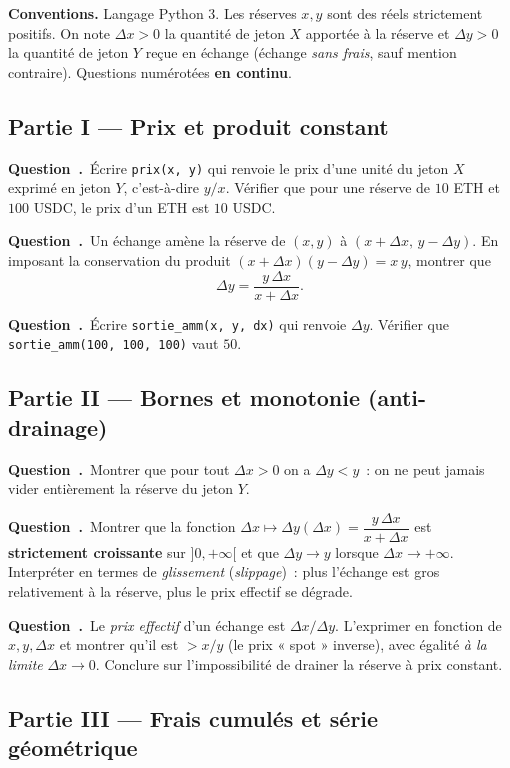 \documentclass[11pt,a4paper]{article}
\newcounter{qcnt}
\newcommand{\Q}{\medskip\par\stepcounter{qcnt}\noindent\textbf{Question~\theqcnt.}~}
\newcommand{\code}[1]{\lstinline!#1!}
\begin{document}
\noindent\textbf{Conventions.} Langage Python 3. Les réserves $x,y$ sont des réels
strictement positifs. On note $\Delta x > 0$ la quantité de jeton $X$ apportée à la réserve et
$\Delta y > 0$ la quantité de jeton $Y$ reçue en échange (échange \emph{sans frais}, sauf mention
contraire). Questions numérotées \textbf{en continu}.

\medskip
\subsection*{Partie I --- Prix et produit constant}

\Q Écrire \code{prix(x, y)} qui renvoie le prix d'une unité du jeton $X$ exprimé en jeton $Y$,
c'est-à-dire $y/x$. Vérifier que pour une réserve de $10$ ETH et $100$ USDC, le prix d'un ETH est
$10$ USDC.

\Q Un échange amène la réserve de $(x, y)$ à $(x + \Delta x,\, y - \Delta y)$. En imposant la
conservation du produit $(x+\Delta x)(y-\Delta y) = x\,y$, montrer que
$$\Delta y = \frac{y\,\Delta x}{x + \Delta x}.$$

\Q Écrire \code{sortie_amm(x, y, dx)} qui renvoie $\Delta y$. Vérifier que
\code{sortie_amm(100, 100, 100)} vaut $50$.

\subsection*{Partie II --- Bornes et monotonie (anti-drainage)}

\Q Montrer que pour tout $\Delta x > 0$ on a $\Delta y < y$~: on ne peut jamais vider entièrement
la réserve du jeton $Y$.

\Q Montrer que la fonction $\Delta x \mapsto \Delta y(\Delta x) = \dfrac{y\,\Delta x}{x+\Delta x}$
est \textbf{strictement croissante} sur $]0, +\infty[$ et que $\Delta y \to y$ lorsque
$\Delta x \to +\infty$. Interpréter en termes de \emph{glissement} (\emph{slippage})~: plus
l'échange est gros relativement à la réserve, plus le prix effectif se dégrade.

\Q Le \emph{prix effectif} d'un échange est $\Delta x / \Delta y$. L'exprimer en fonction de
$x, y, \Delta x$ et montrer qu'il est $> x/y$ (le prix « spot » inverse), avec égalité
\emph{à la limite} $\Delta x \to 0$. Conclure sur l'impossibilité de drainer la réserve à prix
constant.

\subsection*{Partie III --- Frais cumulés et série géométrique}
\end{document}
